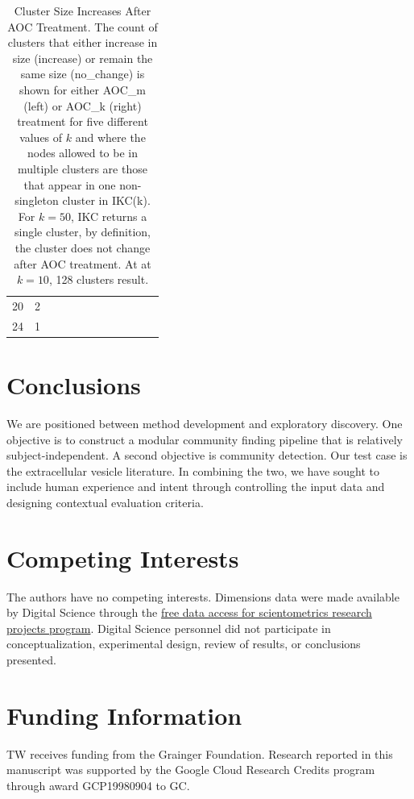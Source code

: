 \documentclass[12pt, oneside]{article}   	%
\begin{document}
\begin{table}
{\begin{tabular}{clllllllllll}
20 &   2 &  &  &  &  &  &  &  &  &  \\ 
24 &   1 &  &  &  &  &  &  &  &  &  \\ 
   \hline
\end{tabular}}
\caption{Cluster Size Increases After AOC Treatment. The count of clusters that either increase in size (increase) or remain the same size (no\_change) is shown for either AOC\_m (left) or AOC\_k (right) treatment for five different values of $k$ and where the nodes allowed to be in multiple clusters are those that appear in one non-singleton cluster in IKC(k). For $k=50$, IKC returns a single cluster, by definition, the cluster does not change after AOC treatment. At at $k=10$, 128 clusters result.}
\label{tab:tab3}
\end{table}

\clearpage

\section{Conclusions} We are positioned between method development and exploratory discovery. One objective is to construct a modular community finding pipeline that is relatively subject-independent. A second objective is community detection. Our test case is the extracellular vesicle literature. In combining the two, we have sought to include human experience and intent \citep{vonluxburg2012clustering} through controlling the input data and designing contextual evaluation criteria.

\section*{Competing Interests} \vspace{3mm} The authors have no competing interests. Dimensions data were made available by Digital Science through the \href{http://www.dimensions.ai/scientometric-research/.}{free data access for scientometrics research projects program}. Digital Science personnel did not participate in conceptualization, experimental design, review of results, or conclusions presented. 

\section*{Funding Information} TW receives funding from the Grainger Foundation. Research reported in this manuscript was supported by the Google Cloud Research Credits program through award GCP19980904 to GC.
\end{document}

